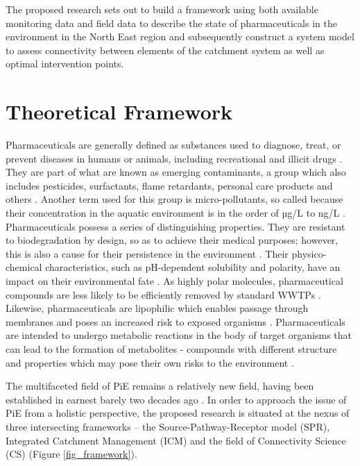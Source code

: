 \documentclass{article}
\begin{document}
The proposed research sets out to build a framework using both available monitoring data and field data to describe the state of pharmaceuticals in the environment in the North East region and subsequently construct a system model to assess connectivity between elements of the catchment system as well as optimal intervention points. 


\clearpage
\section{Theoretical Framework}
Pharmaceuticals are generally defined as substances used to diagnose, treat, or prevent diseases in humans or animals, including recreational and illicit drugs \citep{Quesada2019SurfaceReview}. They are part of what are known as emerging contaminants, a group which also includes pesticides, surfactants, flame retardants, personal care products and others \citep{ausderBeek2016PharmaceuticalsPerspectives,Vargas-Berrones2020Emerging-Nonylphenol-}. Another term used for this group is micro-pollutants, so called because their concentration in the aquatic environment is in the order of µg/L to ng/L \citep{Kummerer2009TheChallenges}.  
Pharmaceuticals possess a series of distinguishing properties. They are resistant to biodegradation by design, so as to achieve their medical purposes; however, this is also a cause for their persistence in the environment \citep{Fatta-Kassinos2011PharmaceuticalResearch}. Their physico-chemical characteristics, such as pH-dependent solubility and polarity, have an impact on their environmental fate \citep{Kummerer2009TheChallenges}. As highly polar molecules, pharmaceutical compounds are less likely to be efficiently removed by standard WWTPs \citep{Mompelat2009OccurrenceWater}. Likewise, pharmaceuticals are lipophilic which enables passage through membranes and poses an increased risk to exposed organisms \citep{UNEP2017PharmaceuticalsIssue}. Pharmaceuticals are intended to undergo metabolic reactions in the body of target organisms that can lead to the formation of metabolites - compounds with different structure and properties which may pose their own risks to the environment \citep{Quesada2019SurfaceReview}.  

The multifaceted field of PiE remains a relatively new field, having been established in earnest barely two decades ago \citep{Daughton2016PharmaceuticalsAnalysis}. In order to approach the issue of PiE from a holistic perspective, the proposed research is situated at the nexus of three intersecting frameworks – the Source-Pathway-Receptor model (SPR), Integrated Catchment Management (ICM) and the field of Connectivity Science (CS)  (Figure \ref{fig_framework}). 
\end{document}
